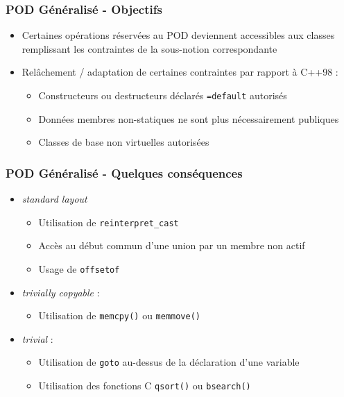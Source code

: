 \documentclass[C++.tex]{subfiles}
\begin{document}
\begin{frame}[fragile]
	\frametitle{POD Généralisé - Objectifs}
	\begin{itemize}
		\item Certaines opérations réservées au POD deviennent accessibles aux classes remplissant les contraintes de la sous-notion correspondante
		\item Relâchement / adaptation de certaines contraintes par rapport à C++98 :
		\begin{itemize}
			\item Constructeurs ou destructeurs déclarés \lstinline|=default| autorisés
			\item Données membres non-statiques ne sont plus nécessairement publiques


			\item Classes de base non virtuelles autorisées

		\end{itemize}
	\end{itemize}
\end{frame}

\begin{frame}[fragile]
	\frametitle{POD Généralisé - Quelques conséquences}
	\begin{itemize}
		\item \textit{standard layout}
		\begin{itemize}
			\item Utilisation de \lstinline|reinterpret_cast|
			\item Accès au début commun d'une union par un membre non actif
			\item Usage de \lstinline|offsetof|
		\end{itemize}
	
		\item \textit{trivially copyable} :
		\begin{itemize}
			\item Utilisation de \lstinline|memcpy()| ou \lstinline|memmove()|
		\end{itemize}

		\item \textit{trivial} :
		\begin{itemize}
			\item Utilisation de \lstinline|goto| \og au-dessus\fg{} de la déclaration d'une variable
			\item Utilisation des fonctions C \lstinline|qsort()| ou \lstinline|bsearch()|
		\end{itemize}
	\end{itemize}
\end{frame}
\end{document}
